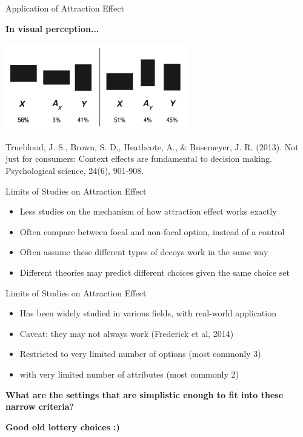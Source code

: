\documentclass[
  ignorenonframetext,
  aspectratio=169]{beamer}
\begin{document}
\begin{frame}{Application of Attraction Effect}
\label{application-of-attraction-effect-2}
\begin{center}
  \textbf{In visual perception...}
\end{center}
\begin{center}
  \includegraphics[width=0.6\textwidth]{intro_perception.png}
\end{center}

\vfill

\hfill \tiny Trueblood, J. S., Brown, S. D., Heathcote, A., \&
Busemeyer, J. R. (2013). Not just for consumers: Context effects are
fundamental to decision making. Psychological science, 24(6), 901-908.
\end{frame}

\begin{frame}{Limits of Studies on Attraction Effect}
\label{limits-of-studies-on-attraction-effect}
\begin{itemize}
  \pause
  \item Less studies on the mechanism of how attraction effect works exactly
  \pause
  \item Often compare between focal and non-focal option, instead of a control
  \pause
  \item Often assume these different types of decoys work in the same way
  \pause
  \item Different theories may predict different choices given the same choice set
\end{itemize}
\end{frame}

\begin{frame}{Limits of Studies on Attraction Effect}
\label{limits-of-studies-on-attraction-effect-1}
\begin{itemize}
  \item Has been widely studied in various fields, with real-world application
  \pause
  \item Caveat: they may not always work (Frederick et al, 2014)
  \pause
  \item Restricted to very limited number of options (most commonly 3)
  \pause
  \item with very limited number of attributes (most commonly 2)
\end{itemize}

\vfill
\begin{center}
  \textbf{What are the settings that are simplistic enough to fit into these narrow criteria?}
\end{center}

\begin{center}
  \pause
  \textbf{Good old lottery choices :)}
\end{center}
\end{frame}
\end{document}
